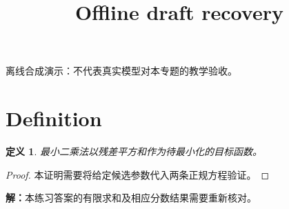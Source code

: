 \documentclass[UTF8,fontset=fandol,11pt]{ctexart}
\title{Offline draft recovery}
\date{}
\newtheorem{definition}{定义}[section]
\begin{document}
\maketitle
\par\noindent 离线合成演示：不代表真实模型对本专题的教学验收。\par
\section{Definition}\label{sec:S01}
\begin{definition}
最小二乘法以残差平方和作为待最小化的目标函数。
\end{definition}
\begin{proof}
本证明需要将给定候选参数代入两条正规方程验证。
\end{proof}
\par\noindent\textbf{解：}本练习答案的有限求和及相应分数结果需要重新核对。\par
\end{document}
